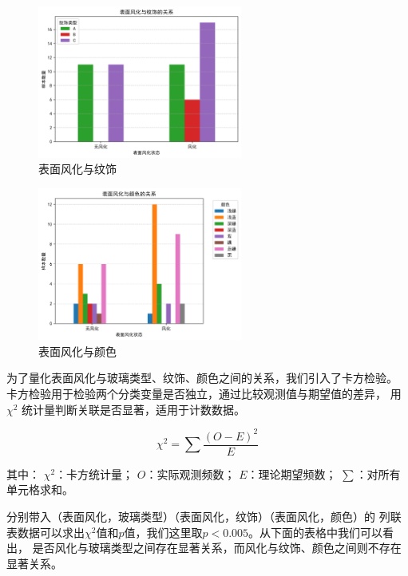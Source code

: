 \documentclass[withoutpreface,bwprint]{cumcmthesis}
\begin{document}
\begin{figure}[H]
\centering
\includegraphics[width=0.6\textwidth]{figures/1.1/1-2.png}
\caption{表面风化与纹饰}
\label{fig:表面风化与纹饰}
\end{figure}

\begin{figure}[H]
\centering
\includegraphics[width=0.6\textwidth]{figures/1.1/1-3.png}
\caption{表面风化与颜色}
\label{fig:表面风化与颜色}
\end{figure}

为了量化表面风化与玻璃类型、纹饰、颜色之间的关系，我们引入了卡方检验。
卡方检验用于检验两个分类变量是否独立，通过比较观测值与期望值的差异，
用 $\chi^2$ 统计量判断关联是否显著，适用于计数数据。


\begin{equation}
\label{eq:公式1}
\chi^2 = \sum \frac{(O - E)^2}{E}
\end{equation}

其中：
 $\chi^2$：卡方统计量；
 $O$：实际观测频数；
 $E$：理论期望频数；
 $\sum$：对所有单元格求和。

分别带入（表面风化，玻璃类型）（表面风化，纹饰）（表面风化，颜色）的
列联表数据可以求出$\chi^2$值和$p$值，我们这里取$p<0.005$。从下面的表格中我们可以看出，
是否风化与玻璃类型之间存在显著关系，而风化与纹饰、颜色之间则不存在显著关系。
\end{document}
